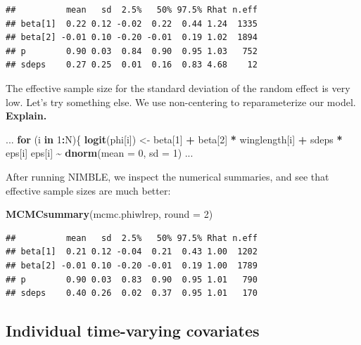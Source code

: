 \documentclass[
  12pt,
]{krantz}
\newenvironment{Shaded}{\begin{snugshade}}{\end{snugshade}}
\newcommand{\AttributeTok}[1]{\textcolor[rgb]{0.13,0.29,0.53}{#1}}
\newcommand{\ControlFlowTok}[1]{\textcolor[rgb]{0.13,0.29,0.53}{\textbf{#1}}}
\newcommand{\DecValTok}[1]{\textcolor[rgb]{0.00,0.00,0.81}{#1}}
\newcommand{\FunctionTok}[1]{\textcolor[rgb]{0.13,0.29,0.53}{\textbf{#1}}}
\newcommand{\NormalTok}[1]{#1}
\newcommand{\OtherTok}[1]{\textcolor[rgb]{0.56,0.35,0.01}{#1}}
\newcommand{\SpecialCharTok}[1]{\textcolor[rgb]{0.81,0.36,0.00}{\textbf{#1}}}
\begin{document}
\begin{verbatim}
##          mean   sd  2.5%   50% 97.5% Rhat n.eff
## beta[1]  0.22 0.12 -0.02  0.22  0.44 1.24  1335
## beta[2] -0.01 0.10 -0.20 -0.01  0.19 1.02  1894
## p        0.90 0.03  0.84  0.90  0.95 1.03   752
## sdeps    0.27 0.25  0.01  0.16  0.83 4.68    12
\end{verbatim}

The effective sample size for the standard deviation of the random effect is very low. Let's try something else. We use non-centering to reparameterize our model. \textbf{Explain.}

\begin{Shaded}
\begin{Highlighting}[]
\NormalTok{...}
  \ControlFlowTok{for}\NormalTok{ (i }\ControlFlowTok{in} \DecValTok{1}\SpecialCharTok{:}\NormalTok{N)\{}
    \FunctionTok{logit}\NormalTok{(phi[i]) }\OtherTok{\textless{}{-}}\NormalTok{ beta[}\DecValTok{1}\NormalTok{] }\SpecialCharTok{+}\NormalTok{ beta[}\DecValTok{2}\NormalTok{] }\SpecialCharTok{*}\NormalTok{ winglength[i] }\SpecialCharTok{+}\NormalTok{ sdeps }\SpecialCharTok{*}\NormalTok{ eps[i]}
\NormalTok{    eps[i] }\SpecialCharTok{\textasciitilde{}} \FunctionTok{dnorm}\NormalTok{(}\AttributeTok{mean =} \DecValTok{0}\NormalTok{, }\AttributeTok{sd =} \DecValTok{1}\NormalTok{)}
\NormalTok{...}
\end{Highlighting}
\end{Shaded}

After running NIMBLE, we inspect the numerical summaries, and see that effective sample sizes are much better:

\begin{Shaded}
\begin{Highlighting}[]
\FunctionTok{MCMCsummary}\NormalTok{(mcmc.phiwlrep, }\AttributeTok{round =} \DecValTok{2}\NormalTok{)}
\end{Highlighting}
\end{Shaded}

\begin{verbatim}
##          mean   sd  2.5%   50% 97.5% Rhat n.eff
## beta[1]  0.21 0.12 -0.04  0.21  0.43 1.00  1202
## beta[2] -0.01 0.10 -0.20 -0.01  0.19 1.00  1789
## p        0.90 0.03  0.83  0.90  0.95 1.01   790
## sdeps    0.40 0.26  0.02  0.37  0.95 1.01   170
\end{verbatim}

\hypertarget{individual-time-varying-covariates}{%
\subsection{Individual time-varying covariates}\label{individual-time-varying-covariates}}
\end{document}
